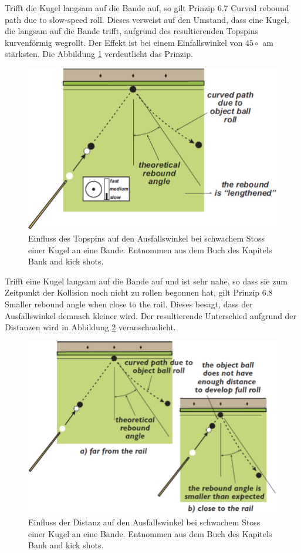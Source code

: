 Trifft die Kugel langsam auf die Bande auf, so gilt Prinzip 6.7 \glqq Curved rebound path due to slow-speed roll\grqq.
Dieses verweist auf den Umstand, dass eine Kugel, die langsam auf die Bande trifft, aufgrund des resultierenden
Topspins kurvenförmig wegrollt. Der Effekt ist bei einem Einfallswinkel von $45\circ$ am stärksten\cite{book:the_ilustrated_principles_of_pool_and_billiards}.
Die Abbildung \ref{fig:rebound_angle_no_spin_slow_shot} verdeutlicht das Prinzip.

\begin{figure}[h!]
    \begin{center}
        \includegraphics[width=0.4\linewidth]{../common/03_billiard_ai/resources/57_rebound_angle_no_spin_slow_shot.png}
    \end{center}
    \caption{Einfluss des Topspins auf den Ausfallswinkel bei schwachem Stoss einer Kugel an eine Bande.
    Entnommen aus dem Buch \cite{book:the_ilustrated_principles_of_pool_and_billiards} des Kapitels  Bank and kick shots\grqq.}
    \label{fig:rebound_angle_no_spin_slow_shot}
\end{figure}

Trifft eine Kugel langsam auf die Bande auf und ist sehr nahe, so dass sie zum Zeitpunkt der Kollision noch nicht zu rollen begonnen hat,
gilt Prinzip 6.8 \glqq Smaller rebound angle when close to the rail\grqq.
Dieses besagt, dass der Ausfallswinkel demnach kleiner wird\cite{book:the_ilustrated_principles_of_pool_and_billiards}.
Der resultierende Unterschied aufgrund der Distanzen wird in Abbildung \ref{fig:rebound_angle_no_spin_slow_shot_distance} veranschaulicht.

\begin{figure}[h!]
    \begin{center}
        \includegraphics[width=0.4\linewidth]{../common/03_billiard_ai/resources/58_rebound_angle_no_spin_slow_shot_distance.png}
    \end{center}
    \caption{Einfluss der Distanz auf den Ausfallswinkel bei schwachem Stoss einer Kugel an eine Bande.
    Entnommen aus dem Buch \cite{book:the_ilustrated_principles_of_pool_and_billiards} des Kapitels  Bank and kick shots\grqq.}
    \label{fig:rebound_angle_no_spin_slow_shot_distance}
\end{figure}

